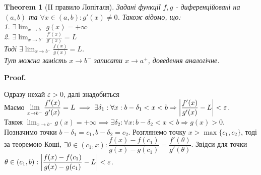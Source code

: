 \documentclass[a4paper, 14pt]{article}
\makeatletter
\def\qed{$\blacksquare$}
\theoremstyle{theoremdd}
\newtheorem{theorem}{Theorem}[subsection]
\theoremstyle{theoremdd}
\theoremstyle{theoremdd}
\theoremstyle{theoremdd}
\theoremstyle{theoremdd}
\theoremstyle{theoremdd}
\theoremstyle{theoremdd}
\theoremstyle{theoremdd}
\renewenvironment{proof}[1][Proof.\\]{\par
\pushQED{\hfill \qed}%
\normalfont \topsep6\p@\@plus6\p@\relax
\trivlist
\item\relax
{\bfseries
#1\@addpunct{.}}\hspace\labelsep\ignorespaces
}{%
\popQED\endtrivlist\@endpefalse
}
\makeatother
\begin{document}
\begin{theorem}[II правило Лопіталя]
Задані функції $f,g$ - диференційовані на $(a,b)$ та $\forall x \in (a,b): g'(x) \neq 0$. Також відомо, що:\\
1. $\exists \displaystyle \lim_{x \to b^-} g(x) = +\infty$\\
2. $\exists \displaystyle \lim_{x \to b^-} \frac{f'(x)}{g'(x)} = L$\\
Тоді $\exists \displaystyle \lim_{x \to b^-} \frac{f(x)}{g(x)} = L$.\\
\textit{Тут можна замість $x \to b^-$ записати $x \to a^+$, доведення аналогічне.}
\end{theorem}

\begin{proof}
Одразу нехай $\varepsilon > 0$, далі знадобиться\\
Маємо $\displaystyle\lim_{x \to b^-} \dfrac{f'(x)}{g'(x)} = L \implies \exists \delta_1: \forall x: b-\delta_1 < x < b \Rightarrow \abs{\dfrac{f'(x)}{g'(x)}-L}<\varepsilon$.\\
Також $\displaystyle\lim_{x \to b^-} g(x) = +\infty \implies \exists \delta_2: \forall x: b-\delta_2 < x < b \Rightarrow g(x) > 0$.\\
Позначимо точки $b-\delta_1 = c_1, b-\delta_2 = c_2$. Розглянемо точку $x > \max \{c_1,c_2\}$, тоді за теоремою Коші, $\exists \theta \in (c_1,x): \dfrac{f(x)-f(c_1)}{g(x)-g(c_1)} = \dfrac{f'(\theta)}{g'(\theta)}$. Звідси для точки $\theta \in (c_1,b): \abs{\dfrac{f(x)-f(c_1)}{g(x)-g(c_1)} -L } < \varepsilon$.\\


\end{proof}
\end{document}
